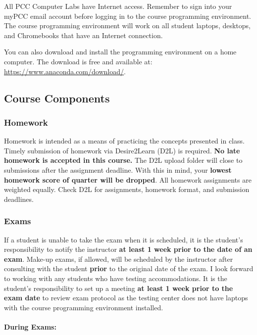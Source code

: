 \documentclass[11pt]{article}
\begin{document}
All PCC Computer Labs have Internet access. Remember to sign into your
myPCC email account before logging in to the course programming
environment. The course programming environment will work on all student
laptops, desktops, and Chromebooks that have an Internet connection.

You can also download and install the programming environment on a home
computer. The download is free and available at:
\url{https://www.anaconda.com/download/}.

    \hypertarget{course-components}{%
\subsection{Course Components}\label{course-components}}

    \hypertarget{homework}{%
\subsubsection{Homework}\label{homework}}

Homework is intended as a means of practicing the concepts presented in
class. Timely submission of homework via Desire2Learn (D2L) is required.
\textbf{No late homework is accepted in this course.} The D2L upload
folder will close to submissions after the assignment deadline. With
this in mind, your \textbf{lowest homework score of quarter will be
dropped}. All homework assignments are weighted equally. Check D2L for
assignments, homework format, and submission deadlines.

    \hypertarget{exams}{%
\subsubsection{Exams}\label{exams}}

If a student is unable to take the exam when it is scheduled, it is the
student's responsibility to notify the instructor \textbf{at least 1
week prior to the date of an exam}. Make-up exams, if allowed, will be
scheduled by the instructor after consulting with the student
\textbf{prior} to the original date of the exam. I look forward to
working with any students who have testing accommodations. It is the
student's responsibility to set up a meeting \textbf{at least 1 week
prior to the exam date} to review exam protocol as the testing center
does not have laptops with the course programming environment installed.

\hypertarget{during-exams}{%
\paragraph{During Exams:}\label{during-exams}}
\end{document}
